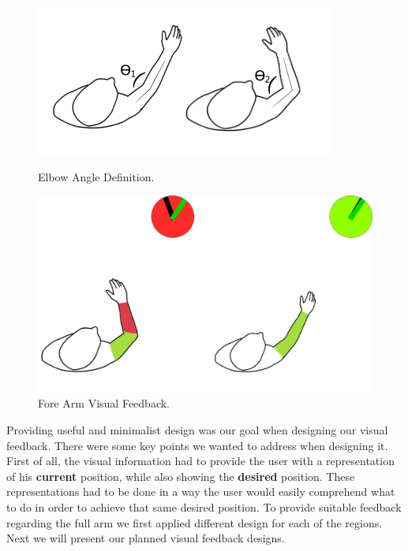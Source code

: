 \begin{figure}[!t]
  \centering
  \includegraphics[width=0.7\linewidth]{imgs/approach/elbowangle}
    \caption{Elbow Angle Definition.}
    \label{fig:elbowangle}
    \endminipage\hfill
{}
  \centering
  \includegraphics[width=0.9\linewidth]{imgs/approach/forearmfeedback}
    \caption{Fore Arm Visual Feedback.}
    \label{fig:forearmfeedback}
    \endminipage
\end{figure}




Providing useful and minimalist design was our goal when designing our visual feedback. There were some key points we wanted to address when designing it.
First of all, the visual information had to provide the user with a representation of his \textbf{current} position, while also showing the \textbf{desired} position. 
These representations had to be done in a way the user would easily comprehend what to do in order to achieve that same desired position.
To provide suitable feedback regarding the full arm we first applied different design for each of the regions. Next we will present our planned visual feedback designs.

